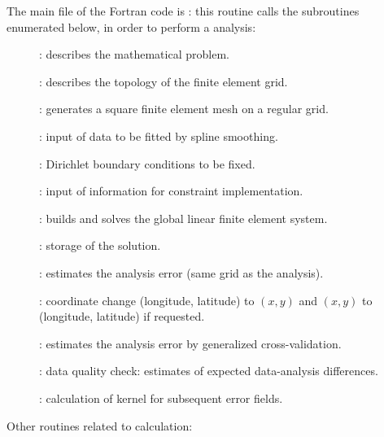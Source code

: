 The main file of the Fortran code is : this routine calls the subroutines enumerated below, in order to perform a \diva analysis:
\vspace{.15cm}
\begin{description}
\item[]: describes the mathematical problem.
\item[]: describes the topology of the finite element grid.
\item[]: generates a square finite element mesh on a regular grid.
\item[]: input of data to be fitted by spline smoothing.
\item[]: Dirichlet boundary conditions to be fixed.
\item[]: input of information for constraint implementation.
\item[]: builds and solves the global linear finite element system.
\item[]: storage of the solution.
\item[]: estimates the analysis error (same grid as the analysis).
\item[]: coordinate change (longitude, latitude) to $(x,y)$ and $(x,y)$ to (longitude, latitude) if requested.
\item[]: estimates the analysis error by generalized cross-validation.  
\item[]: data quality check: estimates of expected data-analysis differences.   
\item[]: calculation of \diva kernel for subsequent error fields.        
\end{description}
\vspace{.15cm}
Other routines related to \diva calculation:

